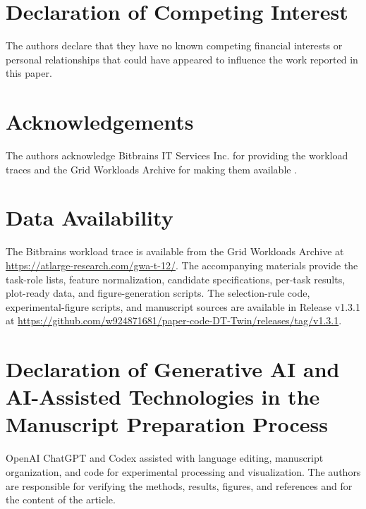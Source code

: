 \documentclass[a4paper,fleqn]{cas-sc}
\begin{document}
\section*{Declaration of Competing Interest}
The authors declare that they have no known competing financial interests
or personal relationships that could have appeared to influence the work
reported in this paper.

\section*{Acknowledgements}
The authors acknowledge Bitbrains IT Services Inc. for providing the workload
traces and the Grid Workloads Archive for making them available
\cite{refBitbrains,refGWA}.

\section*{Data Availability}
The Bitbrains workload trace is available from the Grid Workloads Archive
at \url{https://atlarge-research.com/gwa-t-12/}. The accompanying materials
provide the task-role lists, feature normalization, candidate specifications,
per-task results, plot-ready data, and figure-generation scripts.
The selection-rule code, experimental-figure scripts, and manuscript sources
are available in Release v1.3.1 at
\url{https://github.com/w924871681/paper-code-DT-Twin/releases/tag/v1.3.1}.

\section*{Declaration of Generative AI and AI-Assisted Technologies
in the Manuscript Preparation Process}
OpenAI ChatGPT and Codex assisted with language editing, manuscript
organization, and code for experimental processing and visualization.
The authors are responsible for verifying the methods, results, figures,
and references and for the content of the article.
\end{document}
